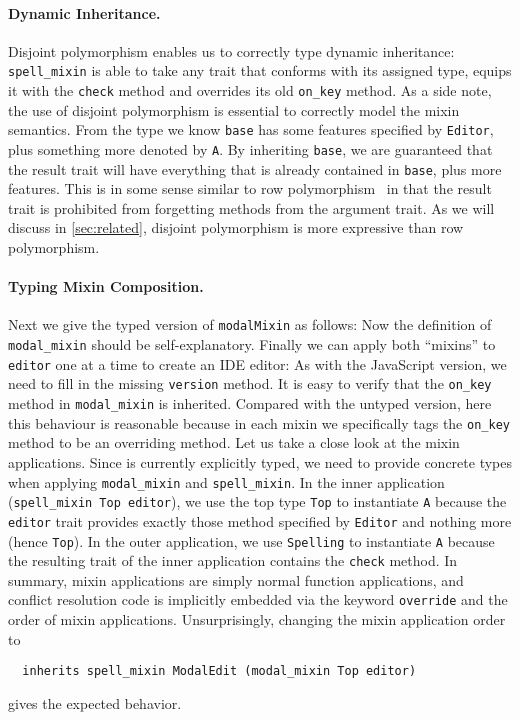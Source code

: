 \paragraph{Dynamic Inheritance.}

Disjoint polymorphism enables us to correctly type dynamic inheritance:
\lstinline{spell_mixin} is able to take any trait that conforms with its
assigned type, equips it with the \lstinline{check} method and overrides its
old \lstinline{on_key} method. As a side note, the use of disjoint polymorphism
is essential to correctly model the mixin semantics. From the type we know
\lstinline{base} has some features specified by \lstinline{Editor}, plus
something more denoted by \lstinline{A}. By inheriting \lstinline{base}, we are
guaranteed that the result trait will have everything that is already contained
in \lstinline{base}, plus more features. This is in some sense similar to row
polymorphism~\cite{wand1994type} in that the result trait is prohibited from
forgetting methods from the argument trait. As we will discuss in
\cref{sec:related}, disjoint polymorphism is more expressive than row
polymorphism.


\paragraph{Typing Mixin Composition.}
Next we give the typed version of \lstinline{modalMixin} as follows:
Now the definition of \lstinline{modal_mixin} should be self-explanatory.
Finally we can apply both ``mixins'' to \lstinline{editor} one at a time to create
an IDE editor:
As with the JavaScript version, we need to fill in the missing
\lstinline{version} method. It is easy to verify that the \lstinline{on_key} method
in \lstinline{modal_mixin} is inherited. Compared with the untyped version,
here this behaviour is reasonable because in each mixin we specifically tags the
\lstinline{on_key} method to be an overriding method. Let us take a close look
at the mixin applications. Since \sedel is currently explicitly typed, we need to
provide concrete types when applying \lstinline{modal_mixin} and \lstinline{spell_mixin}.
In the inner application (\lstinline{spell_mixin Top editor}), we use the top
type \lstinline{Top} to instantiate \lstinline{A} because the \lstinline{editor} trait
provides exactly those method specified by \lstinline{Editor} and nothing more
(hence \lstinline{Top}). In the outer application, we use \lstinline{Spelling}
to instantiate \lstinline{A} because the resulting trait of the inner application
contains the \lstinline{check} method.
In summary, mixin applications are simply normal function applications,
and conflict resolution code is implicitly embedded via the keyword \lstinline{override}
and the order of mixin applications.
Unsurprisingly, changing the mixin application order to
\begin{lstlisting}
  inherits spell_mixin ModalEdit (modal_mixin Top editor)
\end{lstlisting}
gives the expected behavior.


